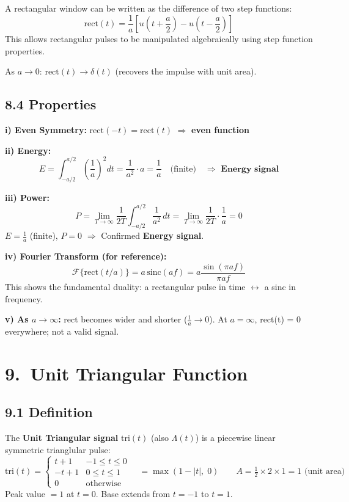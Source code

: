 \documentclass[10pt,a4paper]{article}
\begin{document}
A rectangular window can be written as the difference of two step functions:
\[
\mathrm{rect}(t) = \frac{1}{a}\left[u\!\left(t + \frac{a}{2}\right) - u\!\left(t - \frac{a}{2}\right)\right]
\]
This allows rectangular pulses to be manipulated algebraically using step function properties.

As $a \to 0$: $\mathrm{rect}(t) \to \delta(t)$ (recovers the impulse with unit area).

\subsection*{8.4 Properties}

\begin{propbox}
\textbf{i) Even Symmetry:} $\mathrm{rect}(-t) = \mathrm{rect}(t)$ $\Rightarrow$ \textbf{even function}

\textbf{ii) Energy:}
\[
E = \int_{-a/2}^{a/2}\left(\frac{1}{a}\right)^2 dt = \frac{1}{a^2} \cdot a = \frac{1}{a} \quad \text{(finite)} \quad \Rightarrow \textbf{ Energy signal}
\]

\textbf{iii) Power:}
\[
P = \lim_{T\to\infty}\frac{1}{2T}\int_{-a/2}^{a/2}\frac{1}{a^2}\,dt = \lim_{T\to\infty}\frac{1}{2T}\cdot\frac{1}{a} = 0
\]
$E = \tfrac{1}{a}$ (finite), $P = 0$ $\Rightarrow$ Confirmed \textbf{Energy signal}.

\textbf{iv) Fourier Transform (for reference):}
\[
\mathcal{F}\{\mathrm{rect}(t/a)\} = a\,\mathrm{sinc}(af) = a\frac{\sin(\pi a f)}{\pi a f}
\]
This shows the fundamental duality: a rectangular pulse in time $\leftrightarrow$ a sinc in frequency.

\textbf{v) As $a \to \infty$:} rect becomes wider and shorter ($\frac{1}{a} \to 0$). At $a=\infty$, rect(t) = 0 everywhere; not a valid signal.
\end{propbox}

\section{9.\ Unit Triangular Function}

\subsection*{9.1 Definition}

\begin{rectbox}
The \textbf{Unit Triangular signal} $\mathrm{tri}(t)$ (also $\Lambda(t)$) is a piecewise linear symmetric trianglular pulse:
\[
\mathrm{tri}(t) = \begin{cases}t+1 & -1 \leq t \leq 0\\ -t+1 & 0 \leq t \leq 1\\ 0 & \text{otherwise}\end{cases}
\quad = \max(1-|t|,\; 0) \qquad A = \tfrac{1}{2}\times 2 \times 1 = 1 \text{ (unit area)}
\]
Peak value $= 1$ at $t = 0$. Base extends from $t = -1$ to $t = 1$.
\end{rectbox}
\end{document}
